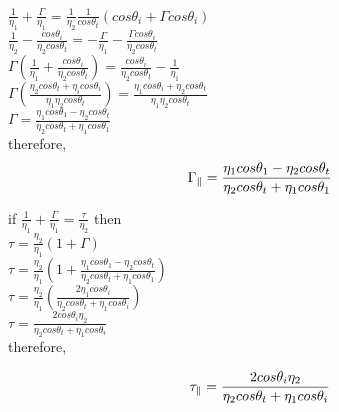 \begin{center}
$\frac{1}{\eta_{1}} + \frac{\Gamma}{\eta_{1}} = \frac{1}{\eta_{2}} \frac{1}{cos\theta_{t}} (cos\theta_{i} + \Gamma cos\theta_{i}) $\newline
\\
$ \frac{1}{\eta_{2}} - \frac{cos\theta_{i}}{\eta_{2} cos\theta_{t}} = - \frac{\Gamma}{\eta_{1}} - \frac{\Gamma cos\theta_{i}}{\eta_{2} cos\theta_{t}}$\newline
\\
$\Gamma (\frac{1}{\eta_{1}} + \frac{cos\theta_{i}}{\eta_{2} cos\theta_{t}}) = \frac{cos\theta_{i}}{\eta_{2} cos\theta_{t}} - \frac{1}{\eta_{1}}$\newline
\\
$\Gamma (\frac{\eta_{2} cos\theta_{t} + \eta_{i} cos\theta_{i}}{\eta_{1} \eta_{2} cos\theta_{t}}) = \frac{\eta_{1} cos\theta_{i} + \eta_{2} cos\theta_{t}}{\eta_{1} \eta_{2} cos\theta_{t}}$\newline
\\
$\Gamma = \frac{\eta_{1} cos\theta_{1} - \eta_{2} cos\theta_{t}}{\eta_{2} cos\theta_{t} + \eta_{1} cos\theta_{1}}$\newline
\\
therefore,
\begin{equation}
\centering
\Gamma_{\parallel} = \frac{\eta_{1} cos\theta_{1} - \eta_{2} cos\theta_{t}}{\eta_{2} cos\theta_{t} + \eta_{1} cos\theta_{1}}
\end{equation}

if $\frac{1}{\eta_{1}} + \frac{\Gamma}{\eta_{1}} = \frac{\tau}{\eta_{2}}$ then\newline
\\
$\tau = \frac{\eta_{2}}{\eta_{1}} (1 + \Gamma)$\newline
\\
$\tau = \frac{\eta_{2}}{\eta_{1}} (1 + \frac{\eta_{1} cos\theta_{1} - \eta_{2} cos\theta_{t}}{\eta_{2} cos\theta_{t} + \eta_{1} cos\theta_{1}})$\newline
\\
$\tau = \frac{\eta_{2}}{\eta_{1}} (\frac{2\eta_{1} cos\theta_{i}}{\eta_{2} cos\theta_{t} + \eta_{1} cos\theta_{i}})$\newline
\\
$\tau = \frac{2 cos\theta_{i} \eta_{2}}{\eta_{2} cos\theta_{t} + \eta_{1} cos\theta_{i}}$\newline
\\
therefore,

\end{center}
\begin{equation}
\centering
\tau_{\parallel} = \frac{2 cos\theta_{i} \eta_{2}}{\eta_{2} cos\theta_{t} + \eta_{1} cos\theta_{i}} 
\end{equation}

